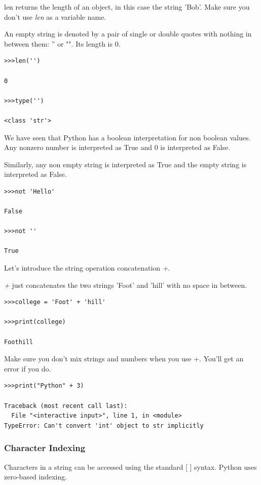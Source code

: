 \documentclass{article}
\begin{document}
len returns the length of an object, in this case the string 'Bob'.  Make sure you don't use \textit{len} as a variable name.

An empty string is denoted by a pair of single or double quotes with nothing in between them: '' or "".  Its length is 0.

\begin{lstlisting}
>>>len('')

0

>>>type('')

<class 'str'> 

\end{lstlisting}

We have seen that Python has a boolean interpretation  for non boolean values.  Any nonzero number is interpreted as True and 0 is interpreted as False.

Similarly, any non empty string is interpreted as True and the empty string is interpreted as False.
\begin{lstlisting}
>>>not 'Hello'

False

>>>not ''

True
\end{lstlisting}

Let's introduce the string operation concatenation \textit{+}.

\textit{+} just concatenates the two strings 'Foot' and 'hill' with no space in between.

\begin{lstlisting}
>>>college = 'Foot' + 'hill'

>>>print(college)

Foothill 
\end{lstlisting}

Make sure you don't mix strings and numbers when you use +.  You’ll get an error if you do.
\begin{lstlisting}
>>>print("Python" + 3)

Traceback (most recent call last):
  File "<interactive input>", line 1, in <module>
TypeError: Can't convert 'int' object to str implicitly
\end{lstlisting}

\subsubsection{Character Indexing}
Characters in a string can be accessed using the standard [ ] syntax.  Python uses zero-based indexing.
\end{document}
